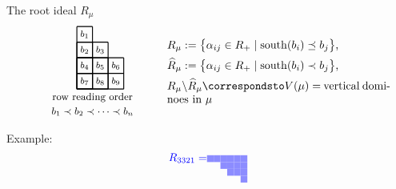 \documentclass[dvipsnames]{beamer}
\newcommand{\south}{{\mathrm{south}}}
\theoremstyle{definition}
\newcommand{\qtrootcolor}{blue!45}
\newcommand{\colorb}[1]{\textcolor{blue}{#1}}
\newcounter{c}
\begin{document}
\begin{frame}{The root ideal \(R_\mu\)}
\begin{align*}
\quad \ \ \
\begin{tikzpicture}[scale = .49]
\begin{scope}
\draw[thick] (0,0) grid (1,4);
\draw[thick] (0,0) grid (2,3);
\draw[thick] (0,0) grid (3,2);
\node at (0.5, 3.5) { \footnotesize $b_1$};
\node at (0.5, 2.5) { \footnotesize $b_2$};
\node at (1.5, 2.5) { \footnotesize $b_3$};
\node at (0.5, 1.5) { \footnotesize $b_4$};
\node at (1.5, 1.5) { \footnotesize $b_5$};
\node at (2.5, 1.5) { \footnotesize $b_6$};
\node at (0.5, 0.5) { \footnotesize $b_7$};
\node at (1.5, 0.5) { \footnotesize $b_8$};
\node at (2.5, 0.5) { \footnotesize $b_9$};
\node at (1,-.54) {\small row reading order };
\node at (1,-1.44) {\small $b_1 \prec b_2 \prec \cdots  \prec b_n$};
\end{scope}
\end{tikzpicture}
\quad  \quad \ \
\raisebox{14mm}{\parbox{7cm}{
$R_\mu  :=  \big\{ \alpha_{ij} \in R_+ \mid  \south(b_i) \preceq b_j
  \big\}$, \\[1.4mm] $\widehat{R}_\mu  :=  \big\{ \alpha_{ij} \in R_+
  \mid  \south(b_i) \prec b_j \big\}$, \\[1.4mm] \(R_\mu \setminus
  \widehat{R}_\mu \correspondsto V(\mu) = \) vertical dominoes in \(\mu\)}}
\end{align*}
\vspace{-1cm}
Example:
\begin{align*}
\raisebox{6.7mm}{$\colorb{R_{3321} = }$}
\begin{tikzpicture}[scale=.213]
\draw[draw = none, fill = \qtrootcolor] (2,-1) rectangle (3,-2);
 \draw[draw = none, fill = \qtrootcolor] (3,-1) rectangle (4,-2);
 \draw[draw = none, fill = \qtrootcolor] (4,-1) rectangle (5,-2);
 \draw[draw = none, fill = \qtrootcolor] (4,-2) rectangle (5,-3);
 \draw[draw = none, fill = \qtrootcolor] (5,-1) rectangle (6,-2);
 \draw[draw = none, fill = \qtrootcolor] (5,-2) rectangle (6,-3);
 \draw[draw = none, fill = \qtrootcolor] (5,-3) rectangle (6,-4);
 \draw[draw = none, fill = \qtrootcolor] (6,-1) rectangle (7,-2);
 \draw[draw = none, fill = \qtrootcolor] (6,-2) rectangle (7,-3);
 \draw[draw = none, fill = \qtrootcolor] (6,-3) rectangle (7,-4);
 \draw[draw = none, fill = \qtrootcolor] (7,-1) rectangle (8,-2);
 \draw[draw = none, fill = \qtrootcolor] (7,-2) rectangle (8,-3);
 \draw[draw = none, fill = \qtrootcolor] (7,-3) rectangle (8,-4);
 \draw[draw = none, fill = \qtrootcolor] (7,-4) rectangle (8,-5);

\end{tikzpicture}
\end{align*}
\end{frame}
\end{document}
